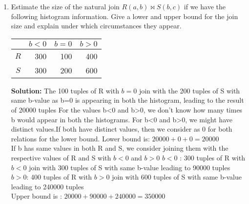 \begin{enumerate}
  {\bf Was not able to solve the below two parts of 1a, on how to estimate values to calculate.}
  The value of b=3 of R is not present in S and the value of b=4 of S is not present in R. Hence we have to estimate - Need explanation from this part onwards until the end of 1a.
  
  How does this estimate compare with the simpler estimate, assuming that all 30 values are equally likely to occur, with $T(R)=75$ and $T(S)=90$?
  
  \item Estimate the size of the natural join $R(a,b) \Join S(b,c)$ if we have the following histogram information.
        Give a lower and upper bound for the join size and explain under which circumstances they appear.

        \begin{center}
          \begin{tabular}{c|r|r|r}
                & $b<0$ & $b=0$ & $b>0$ \\ \hline
            $R$ & 300   & 100   & 400   \\
            $S$ & 300   & 200   & 600   \\
          \end{tabular}
        \end{center}
{\bf Solution:}
The 100 tuples of R with $b = 0$ join with the 200 tuples of S with same b-value as b=0 is appearing in both the histogram, leading to the result of 20000 tuples
For the values b<0 and b>0, we don’t know how many times b would appear in both the histograms.
For b<0 and b>0, we might have distinct values.If both have distinct values, then we consider as 0 for both relations for the lower bound.
Lower bound is: $20000 + 0 + 0 = 20000$\\
If b has same values in both R and S, we consider joining them with the respective values of R and S with $b<0$ and $b>0$
$b<0$ : 300 tuples of R with $b<0$ join with 300 tuples of S with same b-value leading to 90000 tuples
$b>0$: 400 tuples of R with $b>0$ join with 600 tuples of S with same b-value leading to 240000 tuples\\
Upper bound is : $20000+90000+240000 = 350000$

\end{enumerate}


